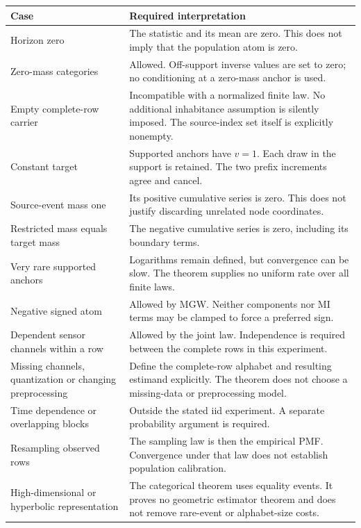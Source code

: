 {\def\LTcaptype{none} %
\begin{longtable}[]{@{}
  >{\raggedright\arraybackslash}p{}
  >{\raggedright\arraybackslash}p{}@{}}
\toprule\noalign{}
\begin{minipage}[b]{\linewidth}\raggedright
Case
\end{minipage} & \begin{minipage}[b]{\linewidth}\raggedright
Required interpretation
\end{minipage} \\
\midrule\noalign{}
\endhead
\bottomrule\noalign{}
\endlastfoot
Horizon zero & The statistic and its mean are zero. This does not imply that the population atom is zero. \\
Zero-mass categories & Allowed. Off-support inverse values are set to zero; no conditioning at a zero-mass anchor is used. \\
Empty complete-row carrier & Incompatible with a normalized finite law. No additional inhabitance assumption is silently imposed. The source-index set itself is explicitly nonempty. \\
Constant target & Supported anchors have \(v=1\). Each draw in the support is retained. The two prefix increments agree and cancel. \\
Source-event mass one & Its positive cumulative series is zero. This does not justify discarding unrelated node coordinates. \\
Restricted mass equals target mass & The negative cumulative series is zero, including its boundary terms. \\
Very rare supported anchors & Logarithms remain defined, but convergence can be slow. The theorem supplies no uniform rate over all finite laws. \\
Negative signed atom & Allowed by MGW. Neither components nor MI terms may be clamped to force a preferred sign. \\
Dependent sensor channels within a row & Allowed by the joint law. Independence is required between the complete rows in this experiment. \\
Missing channels, quantization or changing preprocessing & Define the complete-row alphabet and resulting estimand explicitly. The theorem does not choose a missing-data or preprocessing model. \\
Time dependence or overlapping blocks & Outside the stated iid experiment. A separate probability argument is required. \\
Resampling observed rows & The sampling law is then the empirical PMF. Convergence under that law does not establish population calibration. \\
High-dimensional or hyperbolic representation & The categorical theorem uses equality events. It proves no geometric estimator theorem and does not remove rare-event or alphabet-size costs. \\
\end{longtable}
}

